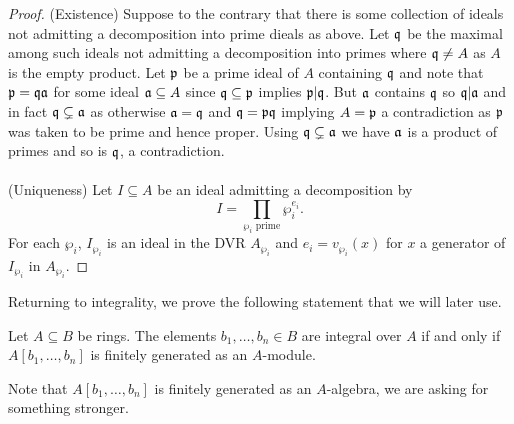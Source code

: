 \begin{proof}
  (Existence) Suppose to the contrary that there is some collection of ideals not admitting a decomposition into prime dieals as above. Let $\mathfrak{q}$ be the maximal among such ideals not admitting a decomposition into primes where $\mathfrak{q}\neq A$ as $A$ is the empty product. Let $\mathfrak{p}$ be a prime ideal of $A$ containing $\mathfrak{q}$ and note that $\mathfrak{p}=\mathfrak{q}\mathfrak{a}$ for some ideal $\mathfrak{a}\subseteq A$ since $\mathfrak{q}\subseteq\mathfrak{p}$ implies $\mathfrak{p}|\mathfrak{q}$. But $\mathfrak{a}$ contains $\mathfrak{q}$ so $\mathfrak{q}|\mathfrak{a}$ and in fact $\mathfrak{q}\subsetneq\mathfrak{a}$ as otherwise $\mathfrak{a}=\mathfrak{q}$ and $\mathfrak{q}=\mathfrak{p}\mathfrak{q}$ implying $A=\mathfrak{p}$ a contradiction as $\mathfrak{p}$ was taken to be prime and hence proper. Using $\mathfrak{q}\subsetneq\mathfrak{a}$ we have $\mathfrak{a}$ is a product of primes and so is $\mathfrak{q}$, a contradiction. 
  \\\\
  (Uniqueness) Let $I\subseteq A$ be an ideal admitting a decomposition by 
  $$I=\prod_{\wp_{i}\text{ prime}}\wp_{i}^{e_{i}}.$$
  For each $\wp_{i}$, $I_{\wp_{i}}$ is an ideal in the DVR $A_{\wp_{i}}$ and $e_{i}=v_{\wp_{i}}(x)$ for $x$ a generator of $I_{\wp_{i}}$ in $A_{\wp_{i}}$.
\end{proof}
Returning to integrality, we prove the following statement that we will later use. 
\begin{proposition}\label{prop:integral over iff finite generation as a module}
  Let $A\subseteq B$ be rings. The elements $b_{1},\dots,b_{n}\in B$ are integral over $A$ if and only if $A[b_{1},\dots,b_{n}]$ is finitely generated as an $A$-module. 
\end{proposition}
Note that $A[b_{1},\dots,b_{n}]$ is finitely generated as an $A$-algebra, we are asking for something stronger. 
